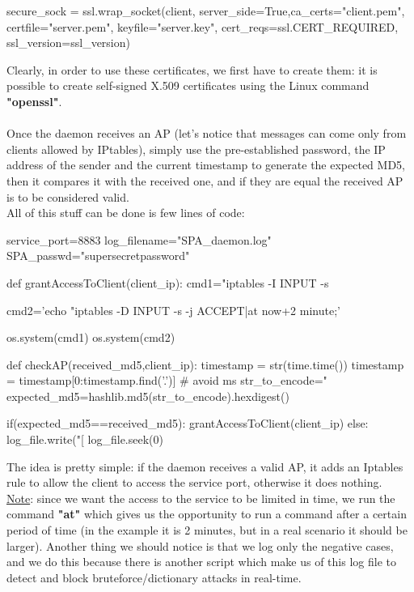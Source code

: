 \documentclass[12pt]{report}
\begin{document}
{\begin{python}
secure_sock = ssl.wrap_socket(client, server_side=True,ca_certs="client.pem",
                               certfile="server.pem",
                               keyfile="server.key",
                               cert_reqs=ssl.CERT_REQUIRED,
                               ssl_version=ssl_version)
\end{python}

\bigskip
Clearly, in order to use these certificates, we first have to create them: it is possible to create self-signed X.509 certificates using the Linux command \textbf{"openssl"}.\\\\
Once the daemon receives an AP (let's notice that messages can come only from clients allowed by IPtables), simply use the pre-established password, the IP address of the sender and the current timestamp to generate the expected MD5, then it compares it with the received one, and if they are equal the received AP is to be considered valid.\\
All of this stuff can be done is few lines of code:\\

\begin{python}

service_port=8883
log_filename="SPA_daemon.log"
SPA_passwd="supersecretpassword"

def grantAccessToClient(client_ip):
	cmd1="iptables -I INPUT -s %
	
	cmd2='echo "iptables -D INPUT -s %
				-j ACCEPT|at now+2 minute;' %
				
	os.system(cmd1)
	os.system(cmd2)			        												 
				        												 
			       																							  
def checkAP(received_md5,client_ip):
	timestamp = str(time.time())
	timestamp = timestamp[0:timestamp.find('.')] # avoid ms
	str_to_encode="%
	expected_md5=hashlib.md5(str_to_encode).hexdigest()

	if(expected_md5==received_md5):
		grantAccessToClient(client_ip)
	else:
		log_file.write("[%
		log_file.seek(0)
	
\end{python}
\bigskip

The idea is pretty simple: if the daemon receives a valid AP, it adds an Iptables rule to allow the client to access the service port, otherwise it does nothing.\\
\underline{Note}: since we want the access to the service to be limited in time, we run the command \textbf{"at"} which gives us the opportunity to run a command after a certain period of time (in the example it is 2 minutes, but in a real scenario it should be larger). Another thing we should notice is that we log only the negative cases, and we do this because there is another script which make us of this log file to detect and block bruteforce/dictionary attacks in real-time.\\

}
\end{document}
